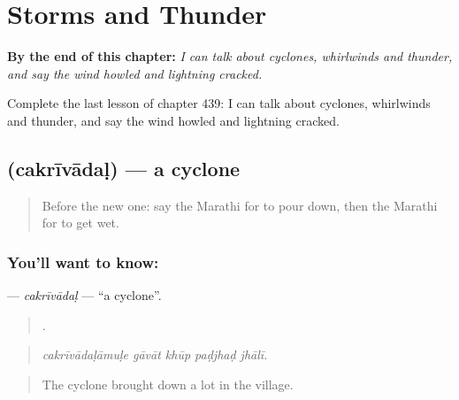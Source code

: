 
\chapter{Storms and Thunder}
\label{ch:mr-storms-and-thunder}

\begin{chapteropening}
\textbf{By the end of this chapter:} \emph{I can talk about cyclones, whirlwinds and thunder, and say the wind howled and lightning cracked.}

Complete the last lesson of chapter 439: I can talk about cyclones, whirlwinds and thunder, and say the wind howled and lightning cracked.
\end{chapteropening}

\section[\texorpdfstring{\mr{चक्रीवादळ} (cakrīvādaḷ)}{चक्रीवादळ (cakrīvādaḷ)}]{ (cakrīvādaḷ) — a cyclone}

\label{lesson:MR-C439-cakrivadal}



\begin{quote}
Before the new one: say the Marathi for to pour down, then the Marathi for to get wet.
\end{quote}

\subsection*{You'll want to know: }
\textbf{} — \emph{cakrīvādaḷ} — \textquotedblleft{}a cyclone\textquotedblright{}.

\begin{quote}
    .
\end{quote}

\begin{quote}
\emph{cakrīvādaḷāmuḷe gāvāt khūp paḍjhaḍ jhālī.}
\end{quote}

\begin{quote}
The cyclone brought down a lot in the village.
\end{quote}

